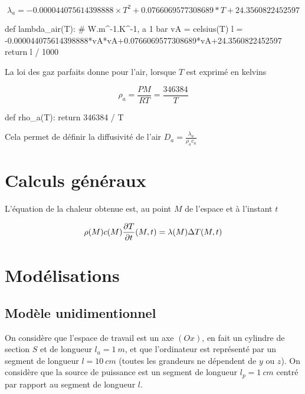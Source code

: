 \documentclass{article}
\begin{document}
$$\lambda_{a} = -0.000044075614398888 \times T^2 + 0.0766069577308689*T + 24.3560822452597$$

\begin{python}
def lambda_air(T): # W.m^-1.K^-1, a 1 bar
    vA = celsius(T)
    l = -0.000044075614398888*vA*vA+0.0766069577308689*vA+24.3560822452597
    return l / 1000
\end{python}

La loi des gaz parfaits donne pour l'air, lorsque $T$ est exprimé en kelvins

$$\rho_a = \frac{PM}{RT} = \frac{346384}{T}$$

\begin{python}
def rho_a(T):
    return 346384 / T
\end{python}

Cela permet de définir la diffusivité de l'air $D_a = \frac{\lambda_a}{\rho_a c_a}$

\section{Calculs généraux}

L'équation de la chaleur obtenue est, au point $M$ de l'espace et à l'instant $t$

$$\rho(M) c(M) \pdv{T}{t}\/(M, t) = \lambda (M) \Delta T(M, t) $$

\section{Modélisations}

\subsection{Modèle unidimentionnel}

On considère que l'espace de travail est un axe $(Ox)$, en fait un cylindre de section $S$ et de longueur $l_a = \SI{1}{m}$, et que l'ordinateur est représenté par un segment de longueur $l = \SI{10}{cm}$ (toutes les grandeurs ne dépendent de $y$ ou $z$). On considère que la source de puissance est un segment de longueur $l_p = \SI{1}{cm}$ centré par rapport au segment de longueur $l$.

\end{document}
